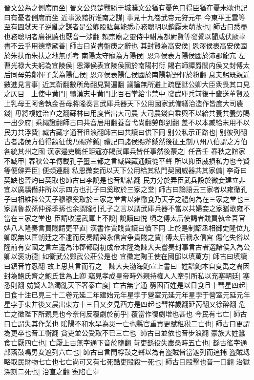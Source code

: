 晉文公為之側席而坐|{
	晉文公與楚戰勝于城濮文公猶有憂色曰得臣猶在憂未歇也記曰有憂者側席而坐}
近事汲黯折淮南之謀|{
	事見十九卷武帝元狩元年}
今東平王雲等至有圖弑天子逆亂之謀者是公卿股肱莫能悉心務聰明以銷厭未萌故也|{
	師古曰悉盡也務聰明者廣視聽也厭音一涉翻}
賴宗廟之靈侍中駙馬都尉賢等發覺以聞咸伏厥辜書不云乎用德章厥善|{
	師古曰尚書盤庚之辭也}
其封賢為高安侯|{
	恩澤侯表高安侯國於朱扶而朱扶之地無所考}
南陽太守寵為方陽侯|{
	恩澤侯表方陽侯國於沛郡龍亢}
左曹光禄大夫躬為宜陵侯|{
	恩澤侯表宜陵侯國於南陽村衍}
賜右師譚爵關内侯又封傅太后同母弟鄭惲子業為陽信侯|{
	恩澤侯表陽信侯國於南陽新野惲於粉翻}
息夫躬既親近數進見言事|{
	近其靳翻數所角翻見賢遍翻}
議論無所避上疏歷詆公卿大臣衆畏其口見之仄目　上使中黄門|{
	續漢志中黄門比百石掌給事禁中}
發武庫兵前後十輩送董賢及上乳母王阿舍執金吾母將隆奏言武庫兵器天下公用國家武備繕治造作皆度大司農錢|{
	毋將複姓治直之翻蘇林曰用度皆出大司農}
大司農錢自乘輿不以給共養共養勞賜一出少府|{
	乘繩證翻師古曰共音居用翻養音弋尚翻勞郎到翻}
盖不以本臧給末用不以民力共浮費|{
	臧古藏字通音徂浪翻師古曰共讀曰供下同}
别公私示正路也|{
	别彼列翻}
古者諸侯方伯得顓征伐乃賜斧鉞|{
	禮記曰諸侯賜斧鉞然後征王制八州八伯謂之方伯各統其州之國}
漢家邉吏職任距寇亦賜武庫兵皆任事然後蒙之|{
	任音壬}
春秋之誼家不臧甲|{
	春秋公羊傳載孔子墮三都之言臧與藏通讀從平聲}
所以抑臣威損私力也今賢等便僻弄臣|{
	便頻連翻}
私恩微妾而以天下公用給其私門契國威器共其家備|{
	李奇曰契缺也晉灼曰契取也師古曰李說是也音詰結翻}
民力分於弄臣武兵設於微妾建立非宜以廣驕僭非所以示四方也孔子曰奚取於三家之堂|{
	師古曰論語云三家者以雍徹孔子曰相維辟公天子穆穆奚取於三家之堂言以雍徹食乃天子之禮何為在三家之堂也三家謂魯叔孫仲孫季孫也余謂隆引孔子之言以謂武庫兵器不當以共婦妾之家猶歌雍不當在三家之堂也}
臣請收還武庫上不說|{
	說讀曰悦}
頃之傅太后使謁者賤買執金吾官婢八人隆奏言買賤請更平直|{
	漢書作賈賤賈讀曰價下同}
上於是制詔丞相御史隆位九卿既無以匡朝廷之不逮而反奏請與永信宫争貴賤之賈|{
	傅太后稱永信宫}
傷化失俗以隆前有安國之言左遷為沛郡都尉初成帝末隆為諫大夫嘗奏封事言古者選諸侯入為公卿以褒功德|{
	如衛武公鄭武公莊公是也}
宜徵定陶王使在國邸以填萬方|{
	師古曰填讀曰鎮音竹忍翻}
故上思其言而宥之　諫大夫渤海鮑宣上書曰|{
	姓譜鮑本自夏禹之裔因封為鮑氏齊之鮑氏世為上卿}
竊見孝成皇帝時外親持權人人牽引所私以充塞朝廷|{
	塞悉則翻}
妨賢人路濁亂天下奢泰亡度|{
	亡古無字通}
窮困百姓是以日食且十彗星四起|{
	日食十注已見三十二卷元延二年建始元年星孛于營室元延元年星孛于營室元延元年星孛于東井後又晨出東方十三日又夕見西方是四起也彗祥歲翻延芮翻又徐醉翻}
危亡之徵陛下所親見也今奈何反覆劇於前乎|{
	覆當作復劇增也甚也}
今民有七亡|{
	師古曰亡謂失其作業也}
隂陽不和水旱為災一亡也縣官重責更賦租税二亡也|{
	師古曰更謂為更卒也音工衡翻}
貪吏並公受取不已三亡也|{
	師古曰並依也音步浪翻}
豪族大姓蠶食亡厭四亡也|{
	亡厭上古無字通下音於鹽翻}
苛吏繇役失農桑時五亡也|{
	繇古徭字通}
部落鼓鳴男女遮列六亡也|{
	師古曰言閒桴鼔之聲以為有盗賊皆當遮列而追捕}
盗賊刼略取民財物七亡也七亡尚可又有七死酷吏毆殺一死也|{
	師古曰毆擊也音一口翻}
治獄深刻二死也|{
	治直之翻}
寃陷亡辜


